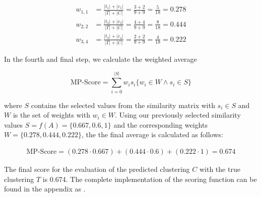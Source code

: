 \begin{align*}
    w_{1,1} &= \frac{|t_1| + |c_1|}{|T|+|C|} = \frac{3 + 2}{9 + 9} = \frac{5}{18} = 0.278 \\
    w_{2,2} &= \frac{|t_2| + |c_2|}{|T|+|C|} = \frac{4 + 4}{9 + 9} = \frac{8}{18} = 0.444 \\
    w_{3,4} &= \frac{|t_3| + |c_4|}{|T|+|C|} = \frac{2 + 2}{9 + 9} = \frac{4}{18} = 0.222
\end{align*}

In the fourth and final step, we calculate the weighted average

\begin{equation}
    \label{equ:weighted_average}
        \text{MP-Score} = \sum_{i=0}^{|S|} w_is_i \{w_i \in W \wedge s_i \in S\}
\end{equation}

where $S$ contains the selected values from the similarity matrix
with $s_{i} \in S$ and $W$ is the set of weights with $w_i \in W$.
Using our previously selected similarity values $S = f(A) = \{0.667, 0.6, 1\}$
and the corresponding weights $W = \{0.278, 0.444, 0.222\}$,
the the final average is calculated as follows:

\begin{align*}
    \text{MP-Score} = (0.278 \cdot 0.667) + (0.444 \cdot 0.6) + (0.222 \cdot 1) = \mathbf{0.674}
\end{align*}

The final score for the evaluation of the predicted clustering $C$ with the true clustering $T$ is 0.674.
The complete implementation of the scoring function can be found in the appendix as .

